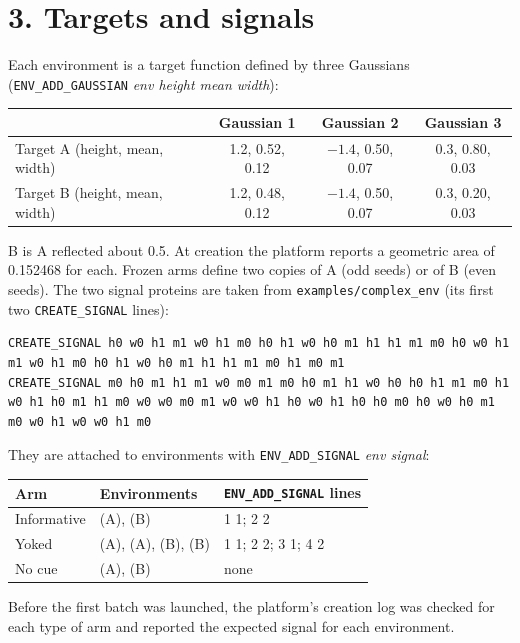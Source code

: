 \section*{3. Targets and signals}
Each environment is a target function defined by three Gaussians
(\texttt{ENV\_ADD\_GAUSSIAN} \emph{env height mean width}):
\begin{center}
\begin{tabular}{@{}lccc@{}}
\toprule
& Gaussian 1 & Gaussian 2 & Gaussian 3\\
\midrule
Target A (height, mean, width) & 1.2, 0.52, 0.12 & $-1.4$, 0.50, 0.07 & 0.3, 0.80, 0.03\\
Target B (height, mean, width) & 1.2, 0.48, 0.12 & $-1.4$, 0.50, 0.07 & 0.3, 0.20, 0.03\\
\bottomrule
\end{tabular}
\end{center}
B is A reflected about 0.5. At creation the platform reports a geometric area of 0.152468 for each. Frozen arms define two copies of A (odd seeds) or of B (even
seeds). The two signal proteins are taken from \texttt{examples/complex\_env}
(its first two \texttt{CREATE\_SIGNAL} lines):
\begin{lstlisting}
CREATE_SIGNAL h0 w0 h1 m1 w0 h1 m0 h0 h1 w0 h0 m1 h1 h1 m1 m0 h0 w0 h1 m1 w0 h1 m0 h0 h1 w0 h0 m1 h1 h1 m1 m0 h1 m0 m1
CREATE_SIGNAL m0 h0 m1 h1 m1 w0 m0 m1 m0 h0 m1 h1 w0 h0 h0 h1 m1 m0 h1 w0 h1 h0 m1 h1 m0 w0 w0 m0 m1 w0 w0 h1 h0 w0 h1 h0 h0 m0 h0 w0 h0 m1 m0 w0 h1 w0 w0 h1 m0
\end{lstlisting}
They are attached to environments with \texttt{ENV\_ADD\_SIGNAL} \emph{env signal}:
\begin{center}
\begin{tabular}{@{}lll@{}}
\toprule
Arm & Environments & \texttt{ENV\_ADD\_SIGNAL} lines\\
\midrule
Informative & (A), (B) & 1 1; 2 2\\
Yoked & (A), (A), (B), (B) & 1 1; 2 2; 3 1; 4 2\\
No cue & (A), (B) & none\\
\bottomrule
\end{tabular}
\end{center}
Before the first batch was launched, the platform's creation log was checked for
each type of arm and reported the expected signal for each environment.

